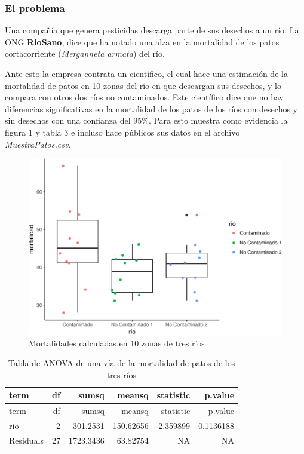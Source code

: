 \documentclass[]{article}
\begin{document}
\subsubsection{El problema}\label{el-problema}

Una compañía que genera pesticidas descarga parte de sus desechos a un
río. La ONG \textbf{RioSano}, dice que ha notado una alza en la
mortalidad de los patos cortacorriente (\emph{Merganneta armata}) del
río.

Ante esto la empresa contrata un científico, el cual hace una estimación
de la mortalidad de patos en 10 zonas del río en que descargan sus
desechos, y lo compara con otros dos ríos no contaminados. Este
científico dice que no hay diferencias significativas en la mortalidad
de los patos de los ríos con desechos y sin desechos con una confianza
del 95\%. Para esto muestra como evidencia la figura 1 y tabla 3 e
incluso hace públicos sus datos en el archivo \emph{MuestraPatos.csv}.

\begin{figure}
\centering
\includegraphics{Guia4_files/figure-latex/unnamed-chunk-3-1.pdf}
\caption{Mortalidades calculadas en 10 zonas de tres ríos}
\end{figure}

\begin{longtable}[]{@{}lrrrrr@{}}
\caption{Tabla de ANOVA de una vía de la mortalidad de patos de los tres
ríos}\tabularnewline
\toprule
term & df & sumsq & meansq & statistic & p.value\tabularnewline
\midrule
\endfirsthead
\toprule
term & df & sumsq & meansq & statistic & p.value\tabularnewline
\midrule
\endhead
rio & 2 & 301.2531 & 150.62656 & 2.359899 & 0.1136188\tabularnewline
Residuals & 27 & 1723.3436 & 63.82754 & NA & NA\tabularnewline
\bottomrule
\end{longtable}
\end{document}

